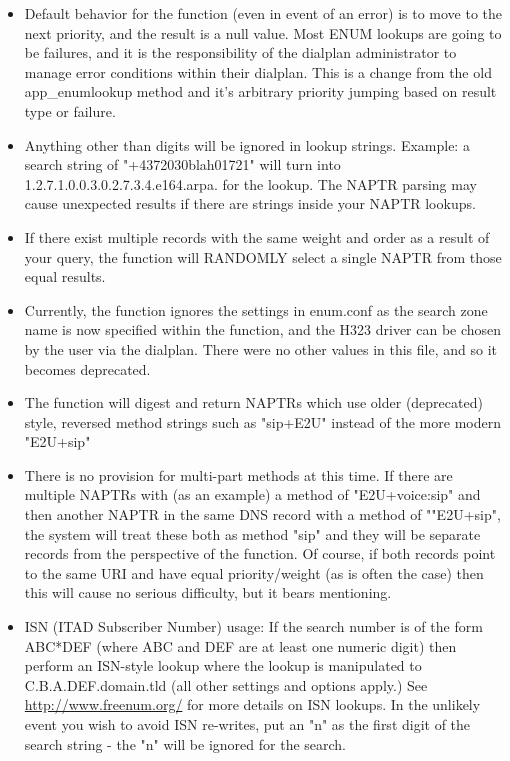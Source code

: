 \begin{itemize}
  \item Default behavior for the function (even in event of an error) is
  to move to the next priority, and the result is a null value.  Most
  ENUM lookups are going to be failures, and it is the responsibility
  of the dialplan administrator to manage error conditions within
  their dialplan.  This is a change from the old app\_enumlookup method
  and it's arbitrary priority jumping based on result type or failure.

  \item Anything other than digits will be ignored in lookup strings.
  Example: a search string of "+4372030blah01721" will turn into
  1.2.7.1.0.0.3.0.2.7.3.4.e164.arpa. for the lookup.  The NAPTR
  parsing may cause unexpected results if there are strings inside
  your NAPTR lookups.

  \item If there exist multiple records with the same weight and order as
  a result of your query, the function will RANDOMLY select a single
  NAPTR from those equal results.

  \item Currently, the function ignores the settings in enum.conf as the
  search zone name is now specified within the function, and the H323
  driver can be chosen by the user via the dialplan.  There were no
  other values in this file, and so it becomes deprecated.

  \item The function will digest and return NAPTRs which use older
  (deprecated) style, reversed method strings such as "sip+E2U"
  instead of the more modern "E2U+sip"

  \item There is no provision for multi-part methods at this time.  If
  there are multiple NAPTRs with (as an example) a method of
  "E2U+voice:sip" and then another NAPTR in the same DNS record with a
  method of ""E2U+sip", the system will treat these both as method
  "sip" and they will be separate records from the perspective of the
  function.  Of course, if both records point to the same URI and have
  equal priority/weight (as is often the case) then this will cause no
  serious difficulty, but it bears mentioning.

  \item ISN (ITAD Subscriber Number) usage:  If the search number is of
  the form ABC*DEF (where ABC and DEF are at least one numeric digit)
  then perform an ISN-style lookup where the lookup is manipulated to
  C.B.A.DEF.domain.tld (all other settings and options apply.)  See
  \url{http://www.freenum.org/} for more details on ISN lookups.  In the
  unlikely event you wish to avoid ISN re-writes, put an "n" as the
  first digit of the search string - the "n" will be ignored for the search.
\end{itemize}

